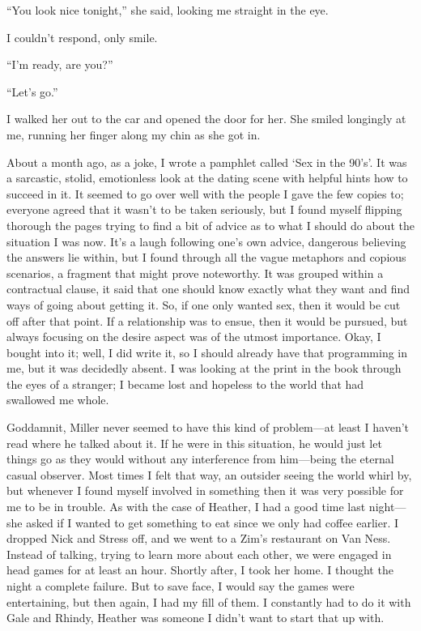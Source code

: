 ``You look nice tonight,'' she said, looking me straight in the eye.

I couldn't respond, only smile.

``I'm ready, are you?''

``Let's go.''

I walked her out to the car and opened the door for her. She smiled
longingly at me, running her finger along my chin as she got in.

About a month ago, as a joke, I wrote a pamphlet called `Sex in the
90's'. It was a sarcastic, stolid, emotionless look at the dating scene
with helpful hints how to succeed in it. It seemed to go over well with
the people I gave the few copies to; everyone agreed that it wasn't to
be taken seriously, but I found myself flipping thorough the pages
trying to find a bit of advice as to what I should do about the
situation I was now. It's a laugh following one's own advice, dangerous
believing the answers lie within, but I found through all the vague
metaphors and copious scenarios, a fragment that might prove noteworthy.
It was grouped within a contractual clause, it said that one should know
exactly what they want and find ways of going about getting it. So, if
one only wanted sex, then it would be cut off after that point. If a
relationship was to ensue, then it would be pursued, but always focusing
on the desire aspect was of the utmost importance. Okay, I bought into
it; well, I did write it, so I should already have that programming in
me, but it was decidedly absent. I was looking at the print in the book
through the eyes of a stranger; I became lost and hopeless to the world
that had swallowed me whole.

Goddamnit, Miller never seemed to have this kind of problem---at least I
haven't read where he talked about it. If he were in this situation, he
would just let things go as they would without any interference from
him---being the eternal casual observer. Most times I felt that way, an
outsider seeing the world whirl by, but whenever I found myself involved
in something then it was very possible for me to be in trouble. As with
the case of Heather, I had a good time last night---she asked if I
wanted to get something to eat since we only had coffee earlier. I
dropped Nick and Stress off, and we went to a Zim's restaurant on Van
Ness. Instead of talking, trying to learn more about each other, we were
engaged in head games for at least an hour. Shortly after, I took her
home. I thought the night a complete failure. But to save face, I would
say the games were entertaining, but then again, I had my fill of them.
I constantly had to do it with Gale and Rhindy, Heather was someone I
didn't want to start that up with.


